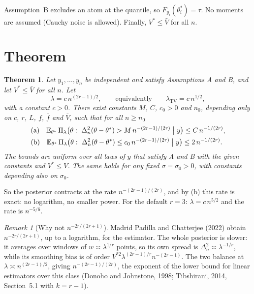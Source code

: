 \documentclass[11pt]{article}
\newtheorem{theorem}{Theorem}
\theoremstyle{definition}
\theoremstyle{remark}
\newtheorem{remark}{Remark}
\newcommand{\E}{\mathbb{E}}
\newcommand{\TV}{\mathrm{TV}}
\newcommand{\lamtv}{\lambda_{\TV}}
\newcommand{\thetas}{\theta^{*}}
\newcommand{\fl}{\underline f}
\newcommand{\fu}{\bar f}
\newcommand{\Vb}{\bar V}
\begin{document}
\noindent Assumption~B excludes an atom at the quantile, so $F_{y_i}(\thetas_i)=\tau$. No moments are assumed (Cauchy noise is allowed). Finally, $V^{*}\le\Vb$ for all $n$.

\section{Theorem}

\begin{theorem}\label{thm:main}
Let $y_1,\dots,y_n$ be independent and satisfy Assumptions A and B, and let $V^{*}\le\Vb$ for all $n$. Let
\[
\lambda=c\,n^{(2r-1)/2},\qquad\text{equivalently}\qquad\lamtv=c\,n^{1/2},
\]
with a constant $c>0$. There exist constants $M$, $C$, $c_0>0$ and $n_0$, depending only on $c$, $r$, $L$, $\fl$, $\fu$ and $\Vb$, such that for all $n\ge n_0$
\begin{align*}
&\text{(a)}\quad \E_{\thetas}\,\Pi_\lambda\bigl(\theta:\ \Delta_n^2(\theta-\thetas)>M\,n^{-(2r-1)/(2r)}\bigm|y\bigr)\le C\,n^{-1/(2r)},\\
&\text{(b)}\quad \E_{\thetas}\,\Pi_\lambda\bigl(\theta:\ \Delta_n^2(\theta-\thetas)\le c_0\,n^{-(2r-1)/(2r)}\bigm|y\bigr)\le 2\,n^{-1/(2r)}.
\end{align*}
The bounds are uniform over all laws of $y$ that satisfy A and B with the given constants and $V^{*}\le\Vb$. The same holds for any fixed $\sigma=\sigma_0>0$, with constants depending also on $\sigma_0$.
\end{theorem}

\noindent So the posterior contracts at the rate $n^{-(2r-1)/(2r)}$, and by (b) this rate is exact: no logarithm, no smaller power. For the default $r=3$: $\lambda=c\,n^{5/2}$ and the rate is $n^{-5/6}$.

\begin{remark}[Why not $n^{-2r/(2r+1)}$]
Madrid Padilla and Chatterjee (2022) obtain $n^{-2r/(2r+1)}$, up to a logarithm, for the estimator. The whole posterior is slower: it averages over windows of $w\asymp\lambda^{1/r}$ points, so its own spread is $\Delta_n^2\asymp\lambda^{-1/r}$, while its smoothing bias is of order $V^{*2}\lambda^{(2r-1)/r}n^{-(2r-1)}$. The two balance at $\lambda\asymp n^{(2r-1)/2}$, giving $n^{-(2r-1)/(2r)}$, the exponent of the lower bound for linear estimators over this class (Donoho and Johnstone, 1998; Tibshirani, 2014, Section~5.1 with $k=r-1$).
\end{remark}
\end{document}
